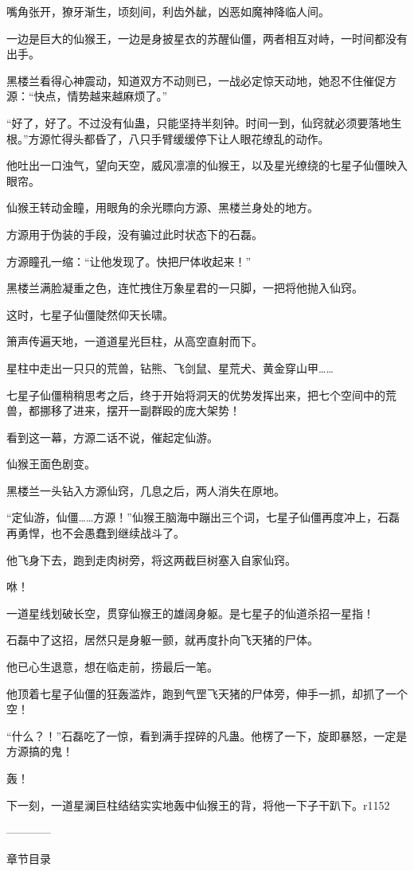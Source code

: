 \begin{this_body}
嘴角张开，獠牙渐生，顷刻间，利齿外龇，凶恶如魔神降临人间。

一边是巨大的仙猴王，一边是身披星衣的苏醒仙僵，两者相互对峙，一时间都没有出手。

黑楼兰看得心神震动，知道双方不动则已，一战必定惊天动地，她忍不住催促方源：“快点，情势越来越麻烦了。”

“好了，好了。不过没有仙蛊，只能坚持半刻钟。时间一到，仙窍就必须要落地生根。”方源忙得头都昏了，八只手臂缓缓停下让人眼花缭乱的动作。

他吐出一口浊气，望向天空，威风凛凛的仙猴王，以及星光缭绕的七星子仙僵映入眼帘。

仙猴王转动金瞳，用眼角的余光瞟向方源、黑楼兰身处的地方。

方源用于伪装的手段，没有骗过此时状态下的石磊。

方源瞳孔一缩：“让他发现了。快把尸体收起来！”

黑楼兰满脸凝重之色，连忙拽住万象星君的一只脚，一把将他抛入仙窍。

这时，七星子仙僵陡然仰天长啸。

箫声传遍天地，一道道星光巨柱，从高空直射而下。

星柱中走出一只只的荒兽，钻熊、飞剑鼠、星荒犬、黄金穿山甲……

七星子仙僵稍稍思考之后，终于开始将洞天的优势发挥出来，把七个空间中的荒兽，都挪移了进来，摆开一副群殴的庞大架势！

看到这一幕，方源二话不说，催起定仙游。

仙猴王面色剧变。

黑楼兰一头钻入方源仙窍，几息之后，两人消失在原地。

“定仙游，仙僵……方源！”仙猴王脑海中蹦出三个词，七星子仙僵再度冲上，石磊再勇悍，也不会愚蠢到继续战斗了。

他飞身下去，跑到走肉树旁，将这两截巨树塞入自家仙窍。

咻！

一道星线划破长空，贯穿仙猴王的雄阔身躯。是七星子的仙道杀招一星指！

石磊中了这招，居然只是身躯一颤，就再度扑向飞天猪的尸体。

他已心生退意，想在临走前，捞最后一笔。

他顶着七星子仙僵的狂轰滥炸，跑到气罡飞天猪的尸体旁，伸手一抓，却抓了一个空！

“什么？！”石磊吃了一惊，看到满手捏碎的凡蛊。他楞了一下，旋即暴怒，一定是方源搞的鬼！

轰！

下一刻，一道星澜巨柱结结实实地轰中仙猴王的背，将他一下子干趴下。r1152

------------

章节目录

\end{this_body}

